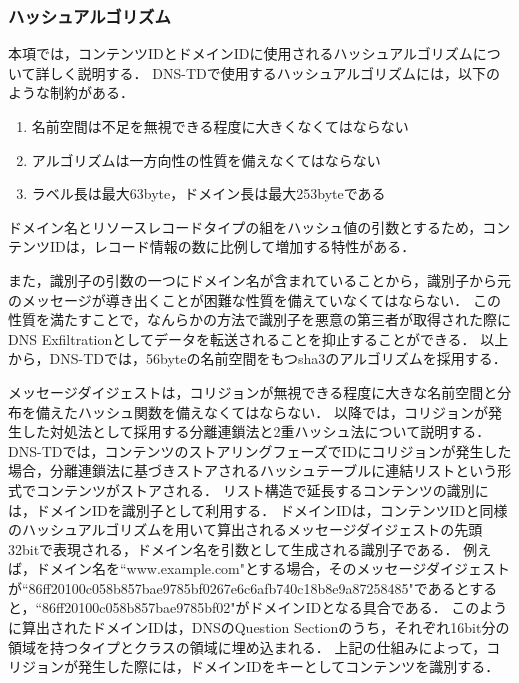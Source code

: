 
\subsubsection{ハッシュアルゴリズム}
本項では，コンテンツIDとドメインIDに使用されるハッシュアルゴリズムについて詳しく説明する．
DNS-TDで使用するハッシュアルゴリズムには，以下のような制約がある．

\begin{enumerate}
 \item 名前空間は不足を無視できる程度に大きくなくてはならない
 \vspace{-3mm}
 \item アルゴリズムは一方向性の性質を備えなくてはならない
 \vspace{-3mm}
 \item ラベル長は最大63byte，ドメイン長は最大253byteである
\end{enumerate}

ドメイン名とリソースレコードタイプの組をハッシュ値の引数とするため，コンテンツIDは，レコード情報の数に比例して増加する特性がある．

また，識別子の引数の一つにドメイン名が含まれていることから，識別子から元のメッセージが導き出くことが困難な性質を備えていなくてはならない．
この性質を満たすことで，なんらかの方法で識別子を悪意の第三者が取得された際にDNS Exfiltrationとしてデータを転送されることを抑止することができる．
以上から，DNS-TDでは，56byteの名前空間をもつsha3のアルゴリズムを採用する．

メッセージダイジェストは，コリジョンが無視できる程度に大きな名前空間と分布を備えたハッシュ関数を備えなくてはならない．
以降では，コリジョンが発生した対処法として採用する分離連鎖法と2重ハッシュ法について説明する．
DNS-TDでは，コンテンツのストアリングフェーズでIDにコリジョンが発生した場合，分離連鎖法に基づきストアされるハッシュテーブルに連結リストという形式でコンテンツがストアされる．
リスト構造で延長するコンテンツの識別には，ドメインIDを識別子として利用する．
ドメインIDは，コンテンツIDと同様のハッシュアルゴリズムを用いて算出されるメッセージダイジェストの先頭32bitで表現される，ドメイン名を引数として生成される識別子である．
例えば，ドメイン名を``www.example.com"とする場合，そのメッセージダイジェストが``86ff20100c058b857bae9785bf0267e6c6afb740c18b8e9a87258485"であるとすると，``86ff20100c058b857bae9785bf02"がドメインIDとなる具合である．
このように算出されたドメインIDは，DNSのQuestion Sectionのうち，それぞれ16bit分の領域を持つタイプとクラスの領域に埋め込まれる．
上記の仕組みによって，コリジョンが発生した際には，ドメインIDをキーとしてコンテンツを識別する．

